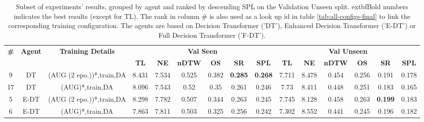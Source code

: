 \begin{table}
\centering
\caption{\label{tab:dagger_envdrop}Subset of experiments' results, grouped by agent and ranked by descending SPL on the Validation Unseen split. 	extbf{Bold} numbers indicates the best results (except for TL). The rank in column \# is also used as a look up id in table \ref{tab:all-configs-final} to link the corresponding training configuration.     \newline The agents are based on Decision Transformer ('DT'), Enhanced Decision Transformer ('E-DT') or Full Decision Transformer ('F-DT').}
\begin{tabular}{@{\hskip3pt}c@{\hskip3pt}c@{\hskip3pt}c@{\hskip3pt}c@{\hskip3pt}c@{\hskip3pt}c@{\hskip3pt}c@{\hskip3pt}c@{\hskip3pt}c@{\hskip3pt}c@{\hskip3pt}c@{\hskip3pt}c@{\hskip3pt}c@{\hskip3pt}c@{\hskip3pt}c}
\toprule
\textbf{\#} & \textbf{Agent} & \textbf{Training Details} & \multicolumn{6}{c}{\textbf{Val Seen}} & \multicolumn{6}{c}{\textbf{Val Unseen}} \\
 \textbf{~} &     \textbf{~} &                \textbf{~} &       \textbf{TL} &    \textbf{NE} &   \textbf{nDTW} &     \textbf{OS} &     \textbf{SR} &    \textbf{SPL} &         \textbf{TL} &     \textbf{NE} &   \textbf{nDTW} &     \textbf{OS} &     \textbf{SR} &    \textbf{SPL} \\
\midrule
          9 &             DT &  (AUG (2 epo.))*,train,DA &             8.431 &          7.534 &           0.525 &           0.382 &  \textbf{0.285} &  \textbf{0.268} &               7.711 &           8.478 &           0.454 &           0.256 &           0.191 &           0.178 \\
         17 &             DT &           (AUG)*,train,DA &             8.096 &          7.543 &            0.52 &            0.35 &           0.261 &           0.246 &                7.73 &           8.411 &           0.448 &           0.251 &           0.183 &           0.165 \\
          5 &           E-DT &  (AUG (2 epo.))*,train,DA &             8.298 &          7.782 &           0.507 &           0.344 &           0.263 &           0.245 &               7.745 &           8.128 &           0.458 &           0.263 &  \textbf{0.199} &           0.183 \\
          6 &           E-DT &           (AUG)*,train,DA &             7.863 &          7.811 &           0.503 &           0.325 &           0.256 &           0.242 &               7.302 &           8.552 &           0.441 &           0.245 &           0.196 &           0.182 \\

\end{tabular}
\end{table}
